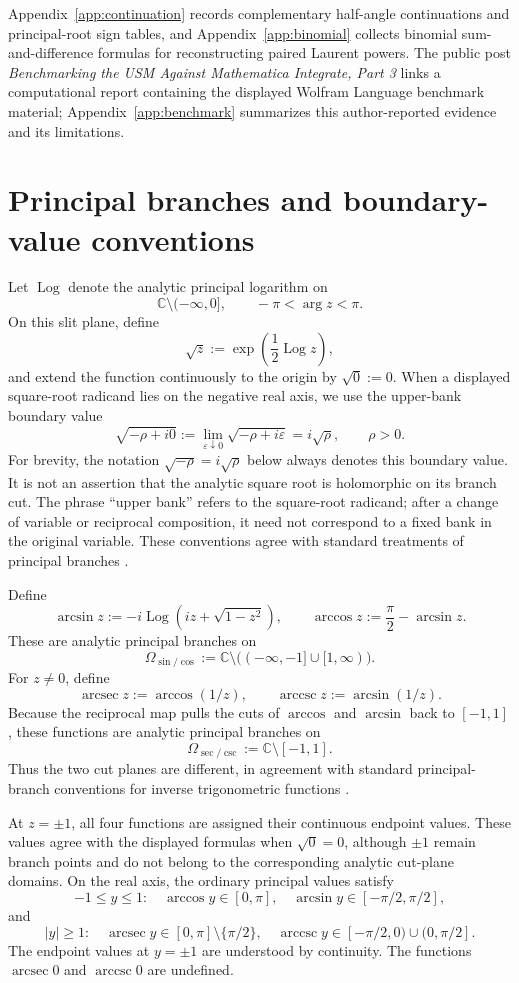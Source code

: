 \documentclass[11pt]{article}
\theoremstyle{remark}
\DeclareMathOperator{\Logop}{Log}
\DeclareMathOperator{\arccsc}{arccsc}
\DeclareMathOperator{\arcsec}{arcsec}
\begin{document}
Appendix~\ref{app:continuation} records complementary half-angle continuations and principal-root sign tables, and Appendix~\ref{app:binomial} collects binomial sum-and-difference formulas for reconstructing paired Laurent powers. The public post \emph{Benchmarking the USM Against Mathematica Integrate, Part 3} \cite{GarciaBenchmark} links a computational report containing the displayed Wolfram Language benchmark material; Appendix~\ref{app:benchmark} summarizes this author-reported evidence and its limitations.

\section{Principal branches and boundary-value conventions}
\label{sec:branches}

Let $\Logop$ denote the analytic principal logarithm on
\[
\mathbb C\setminus(-\infty,0],
\qquad -\pi<\arg z<\pi.
\]
On this slit plane, define
\[
\sqrt z:=\exp\!\left(\frac{1}{2}\Logop z\right),
\]
and extend the function continuously to the origin by $\sqrt0:=0$. When a displayed square-root radicand lies on the negative real axis, we use the upper-bank boundary value
\[
\sqrt{-\rho+i0}:=\lim_{\varepsilon\downarrow0}\sqrt{-\rho+i\varepsilon}=i\sqrt\rho,
\qquad \rho>0.
\]
For brevity, the notation $\sqrt{-\rho}=i\sqrt\rho$ below always denotes this boundary value. It is not an assertion that the analytic square root is holomorphic on its branch cut. The phrase ``upper bank'' refers to the square-root radicand; after a change of variable or reciprocal composition, it need not correspond to a fixed bank in the original variable. These conventions agree with standard treatments of principal branches \cite{Ahlfors,BrownChurchill}.

Define
\[
\arcsin z:=-i\Logop\!\left(iz+\sqrt{1-z^2}\right),
\qquad
\arccos z:=\frac{\pi}{2}-\arcsin z.
\]
These are analytic principal branches on
\[
\Omega_{\sin/\cos}:=\mathbb C\setminus\bigl(( -\infty,-1]\cup[1,\infty)\bigr).
\]
For $z\ne0$, define
\[
\arcsec z:=\arccos(1/z),
\qquad
\arccsc z:=\arcsin(1/z).
\]
Because the reciprocal map pulls the cuts of $\arccos$ and $\arcsin$ back to $[-1,1]$, these functions are analytic principal branches on
\[
\Omega_{\sec/\csc}:=\mathbb C\setminus[-1,1].
\]
Thus the two cut planes are different, in agreement with standard principal-branch conventions for inverse trigonometric functions \cite{DLMF}.

At $z=\pm1$, all four functions are assigned their continuous endpoint values. These values agree with the displayed formulas when $\sqrt0=0$, although $\pm1$ remain branch points and do not belong to the corresponding analytic cut-plane domains. On the real axis, the ordinary principal values satisfy
\[
-1\le y\le1:
\quad
\arccos y\in[0,\pi],
\quad
\arcsin y\in[-\pi/2,\pi/2],
\]
and
\[
|y|\ge1:
\quad
\arcsec y\in[0,\pi]\setminus\{\pi/2\},
\quad
\arccsc y\in[-\pi/2,0)\cup(0,\pi/2].
\]
The endpoint values at $y=\pm1$ are understood by continuity. The functions $\arcsec0$ and $\arccsc0$ are undefined.
\end{document}
